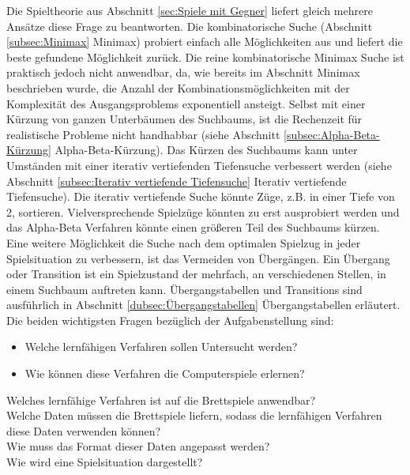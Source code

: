 Die Spieltheorie aus Abschnitt \ref{sec:Spiele mit Gegner} liefert gleich mehrere Ansätze diese Frage zu beantworten. Die kombinatorische Suche (Abschnitt \ref{subsec:Minimax} Minimax) probiert einfach alle Möglichkeiten aus und liefert die beste gefundene Möglichkeit zurück. Die reine kombinatorische Minimax Suche ist praktisch jedoch nicht anwendbar, da, wie bereits im Abschnitt Minimax beschrieben wurde, die Anzahl der Kombinationsmöglichkeiten mit der Komplexität des Ausgangsproblems exponentiell ansteigt. Selbst mit einer Kürzung von ganzen Unterbäumen des Suchbaums, ist die Rechenzeit für realistische Probleme nicht handhabbar (siehe Abschnitt \ref{subsec:Alpha-Beta-Kürzung} Alpha-Beta-Kürzung). Das Kürzen des Suchbaums kann unter Umständen mit einer iterativ vertiefenden Tiefensuche verbessert werden (siehe Abschnitt \ref{subsec:Iterativ vertiefende Tiefensuche} Iterativ vertiefende Tiefensuche). Die iterativ vertiefende Suche könnte Züge, z.B. in einer Tiefe von 2, sortieren. Vielversprechende Spielzüge könnten zu erst ausprobiert werden und das Alpha-Beta Verfahren könnte einen größeren Teil des Suchbaums kürzen. \\

Eine weitere Möglichkeit die Suche nach dem optimalen Spielzug in jeder Spielsituation zu verbessern, ist das Vermeiden von Übergängen. Ein Übergang oder Transition ist ein Spielzustand der mehrfach, an verschiedenen Stellen, in einem Suchbaum auftreten kann. Übergangstabellen und Transitions sind ausführlich in Abschnitt \ref{dubsec:Übergangstabellen} Übergangstabellen erläutert. \\



Die beiden wichtigsten Fragen bezüglich der Aufgabenstellung sind: 
\begin{itemize}
\item Welche lernfähigen Verfahren sollen Untersucht werden?
\item Wie können diese Verfahren die Computerspiele erlernen?
\end{itemize}



Welches lernfähige Verfahren ist auf die Brettspiele anwendbar? \\
Welche Daten müssen die Brettspiele liefern, sodass die lernfähigen Verfahren diese Daten verwenden können? \\
Wie muss das Format dieser Daten angepasst werden? \\
Wie wird eine Spielsituation dargestellt? \\

